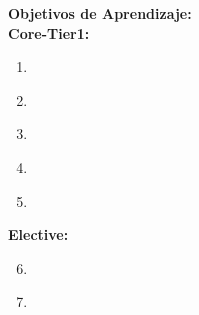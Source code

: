 \noindent \textbf{Objetivos de Aprendizaje:}\\
\noindent \textbf{Core-Tier1:}
\begin{enumerate}
	\setcounter{enumi}{0}
	\item \SPPrivacyandCivilLibertiesLODiscussTheFor\xspace[\SPPrivacyandCivilLibertiesLODiscussTheForLevel]\label{sec:BOK:SPPrivacyandCivilLibertiesLODiscussTheFor}
	\item \SPPrivacyandCivilLibertiesLOEvaluateSolutions\xspace[\SPPrivacyandCivilLibertiesLOEvaluateSolutionsLevel]\label{sec:BOK:SPPrivacyandCivilLibertiesLOEvaluateSolutions}
	\item \SPPrivacyandCivilLibertiesLODescribeTheDataThe\xspace[\SPPrivacyandCivilLibertiesLODescribeTheDataTheLevel]\label{sec:BOK:SPPrivacyandCivilLibertiesLODescribeTheDataThe}
	\item \SPPrivacyandCivilLibertiesLODescribeTheDifferential\xspace[\SPPrivacyandCivilLibertiesLODescribeTheDifferentialLevel]\label{sec:BOK:SPPrivacyandCivilLibertiesLODescribeTheDifferential}
	\item \SPPrivacyandCivilLibertiesLOInvestigateTheTechnological\xspace[\SPPrivacyandCivilLibertiesLOInvestigateTheTechnologicalLevel]\label{sec:BOK:SPPrivacyandCivilLibertiesLOInvestigateTheTechnological}
\end{enumerate}
\noindent \textbf{Elective:}
\begin{enumerate}
	\setcounter{enumi}{5}
	\item \SPPrivacyandCivilLibertiesLOCritiqueThe\xspace[\SPPrivacyandCivilLibertiesLOCritiqueTheLevel]\label{sec:BOK:SPPrivacyandCivilLibertiesLOCritiqueThe}
	\item \SPPrivacyandCivilLibertiesLOIdentifyStrategies\xspace[\SPPrivacyandCivilLibertiesLOIdentifyStrategiesLevel]\label{sec:BOK:SPPrivacyandCivilLibertiesLOIdentifyStrategies}
\end{enumerate}


